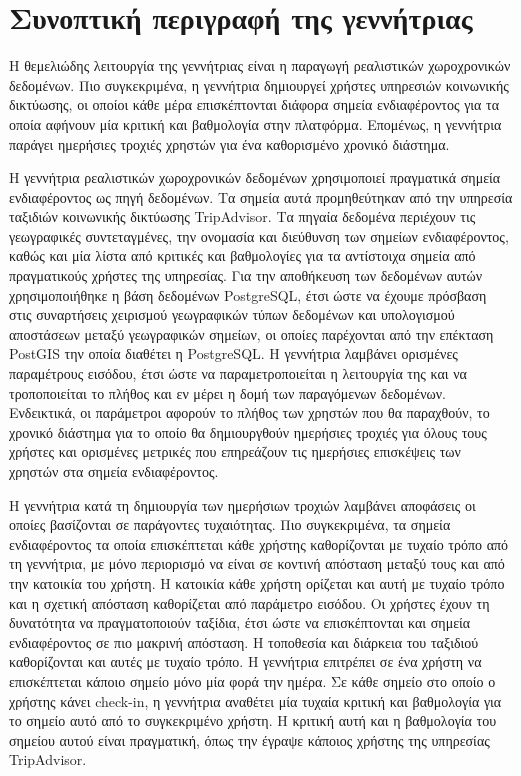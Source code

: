 \section{Συνοπτική περιγραφή της γεννήτριας}

Η θεμελιώδης λειτουργία της γεννήτριας είναι η παραγωγή ρεαλιστικών χωροχρονικών \linebreak δεδομένων. 
Πιο συγκεκριμένα, η γεννήτρια δημιουργεί χρήστες υπηρεσιών κοινωνικής δικτύωσης, οι οποίοι κάθε μέρα επισκέπτονται διάφορα 
σημεία ενδιαφέροντος για τα οποία αφήνουν μία κριτική και βαθμολογία στην πλατφόρμα. Επομένως, η γεννήτρια παράγει ημερήσιες τροχιές χρηστών για ένα 
καθορισμένο χρονικό διάστημα. 

Η γεννήτρια ρεαλιστικών χωροχρονικών δεδομένων χρησιμοποιεί πραγματικά σημεία \linebreak ενδιαφέροντος ως πηγή δεδομένων. Τα σημεία αυτά προμηθεύτηκαν από την υπηρεσία 
ταξιδιών κοινωνικής δικτύωσης TripAdvisor. Τα πηγαία δεδομένα περιέχουν τις γεωγραφικές συντεταγμένες, την ονομασία και διεύθυνση των σημείων ενδιαφέροντος, 
καθώς και μία λίστα από κριτικές και βαθμολογίες για τα αντίστοιχα σημεία από πραγματικούς χρήστες της υπηρεσίας. Για την αποθήκευση των δεδομένων αυτών 
χρησιμοποιήθηκε η βάση δεδομένων PostgreSQL, έτσι ώστε να έχουμε \linebreak πρόσβαση στις συναρτήσεις χειρισμού γεωγραφικών τύπων δεδομένων και 
υπολογισμού αποστάσεων μεταξύ γεωγραφικών σημείων, οι οποίες παρέχονται 
από την επέκταση PostGIS την οποία διαθέτει η PostgreSQL. Η γεννήτρια λαμβάνει ορισμένες παραμέτρους εισόδου, έτσι ώστε να παραμετροποιείται η λειτουργία της 
και να τροποποιείται το πλήθος και εν μέρει η δομή των παραγόμενων δεδομένων. Ενδεικτικά, οι παράμετροι αφορούν το πλήθος των χρηστών που θα παραχθούν, το 
χρονικό διάστημα για το οποίο θα δημιουργθούν ημερήσιες τροχιές για όλους τους χρήστες και ορισμένες μετρικές που επηρεάζουν τις ημερήσιες επισκέψεις των χρηστών 
στα σημεία ενδιαφέροντος.

Η γεννήτρια κατά τη δημιουργία των ημερήσιων τροχιών λαμβάνει αποφάσεις οι οποίες βασίζονται σε παράγοντες τυχαιότητας. Πιο συγκεκριμένα, τα σημεία 
ενδιαφέροντος τα οποία επισκέπτεται κάθε χρήστης καθορίζονται με τυχαίο τρόπο από τη γεννήτρια, με μόνο περιορισμό να είναι σε κοντινή απόσταση μεταξύ τους και από 
την κατοικία του χρήστη. Η κατοικία κάθε χρήστη ορίζεται και αυτή με τυχαίο τρόπο και η σχετική απόσταση καθορίζεται από παράμετρο εισόδου. Οι χρήστες έχουν 
τη δυνατότητα να πραγματοποιούν ταξίδια, έτσι ώστε να επισκέπτονται και σημεία ενδιαφέροντος σε πιο μακρινή απόσταση. Η τοποθεσία και διάρκεια του ταξιδιού 
καθορίζονται και αυτές με τυχαίο τρόπο. Η γεννήτρια επιτρέπει σε ένα χρήστη να επισκέπτεται κάποιο σημείο μόνο μία φορά την ημέρα. Σε κάθε σημείο στο οποίο 
ο χρήστης κάνει check-in, η γεννήτρια αναθέτει μία τυχαία κριτική και βαθμολογία για το σημείο αυτό από το συγκεκριμένο χρήστη. Η κριτική αυτή και η βαθμολογία 
του σημείου αυτού είναι πραγματική, όπως την έγραψε κάποιος χρήστης της υπηρεσίας TripAdvisor.

